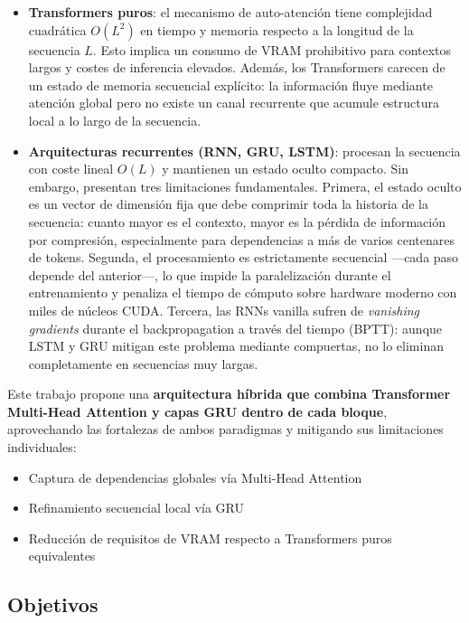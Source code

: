 \begin{itemize}
    \item \textbf{Transformers puros}: el mecanismo de auto-atención tiene complejidad cuadrática $O(L^2)$ en tiempo y memoria respecto a la longitud de la secuencia $L$. Esto implica un consumo de VRAM prohibitivo para contextos largos y costes de inferencia elevados. Además, los Transformers carecen de un estado de memoria secuencial explícito: la información fluye mediante atención global pero no existe un canal recurrente que acumule estructura local a lo largo de la secuencia.
    \item \textbf{Arquitecturas recurrentes (RNN, GRU, LSTM)}: procesan la secuencia con coste lineal $O(L)$ y mantienen un estado oculto compacto. Sin embargo, presentan tres limitaciones fundamentales. Primera, el estado oculto es un vector de dimensión fija que debe comprimir toda la historia de la secuencia: cuanto mayor es el contexto, mayor es la pérdida de información por compresión, especialmente para dependencias a más de varios centenares de tokens. Segunda, el procesamiento es estrictamente secuencial —cada paso depende del anterior—, lo que impide la paralelización durante el entrenamiento y penaliza el tiempo de cómputo sobre hardware moderno con miles de núcleos CUDA. Tercera, las RNNs vanilla sufren de \textit{vanishing gradients} durante el backpropagation a través del tiempo (BPTT): aunque LSTM y GRU mitigan este problema mediante compuertas, no lo eliminan completamente en secuencias muy largas.
\end{itemize}

Este trabajo propone una \textbf{arquitectura híbrida que combina Transformer Multi-Head Attention y capas GRU dentro de cada bloque}, aprovechando las fortalezas de ambos paradigmas y mitigando sus limitaciones individuales:

\begin{itemize}
    \item Captura de dependencias globales vía Multi-Head Attention
    \item Refinamiento secuencial local vía GRU
    \item Reducción de requisitos de VRAM respecto a Transformers puros equivalentes
\end{itemize}

\subsection{Objetivos}

